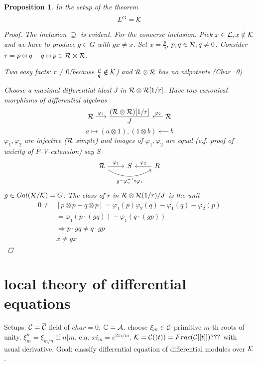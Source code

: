 \documentclass[11pt]{article}
\newtheorem{prop}[thm]{Proposition}
\newcommand{\cplx}{\mathbb C}
\newcommand{\cala}{{\cal A}}
\newcommand{\calc}{{\cal C}}
\newcommand{\calk}{{\cal K}}
\newcommand{\call}{{\cal L}}
\newcommand{\calr}{{\cal R}}
\newcommand{\Lrta}{\Longrightarrow}
\newcommand{\lrta}{\longrightarrow}
\begin{document}
\begin{prop}
In the setup of the theorem
$$
L^G=\calk
$$
\begin{proof}
The inclusion $\supseteq$ is evident. For the converse inclusion. Pick $x\in \call,x\notin\calk$ and we have to produce $g\in G$ with $gx\neq x$. Set $x=\frac{p}{q}$, $p,q\in\calr,q\neq 0$. Consider $r=p\otimes q-q\otimes p\in\calr\otimes\calr$. 

Two easy facts:
$r\neq 0$(because $\frac{p}{q}\notin\calk$) and $\calr\otimes \calr$ has no nilpotents (Char=0)

Choose a maximal differential ideal $J$ in $\calr\otimes\calr[1/r]$. Have tow canonical morphisms of differential algebras
$$
\calr\overset{\varphi_1}{\lrta} \frac{(\calr\otimes\calr)[1/r]}{J}\overset{\varphi_2}{\longleftarrow}\calr
$$
$$
a\longmapsto (a\otimes1),(1\otimes b)\longmapsfrom b
$$
$\varphi_1,\varphi_2$ are injective ($\calr$ simple) and images of $\varphi_1,\varphi_2$ are equal (c.f. proof of unicity of P-V-extension) say $S$
\[
\begin{tikzcd}
\calr\ar[r,"\varphi_1"]\ar[rr,swap,bend right,"g=\varphi^{-1}_2\circ \varphi_1"] & S & R\ar[l,swap,"\varphi_2"]
\end{tikzcd}
\]
$g\in Gal(\calr/\calk)=G$. The class of $r$ in $\calr\otimes\calr(1/r)/J$ is the unit 
$$
\begin{aligned}
0\neq &[p\otimes p-q\otimes p]=\varphi_1(p)\varphi_2(q)-\varphi_1(q)-\varphi_2(p)\\
&= \varphi_1(p\cdot(g q))-\varphi_1(q\cdot(g p))\\
&\Lrta p \cdot g q \neq q \cdot g p\\
& x\neq g x
\end{aligned}
$$
\end{proof}
\end{prop}

\section{local theory of differential equations}
Setups: $\calc=\overline{\calc}$ field of $char=0$. $\cplx=\cala$. choose $\xi_m\in\calc$-primitive $m$-th roots of unity. $\xi_m^n=\xi_{m/n}$ if $n|m.$ e.a. $xi_m=e^{2\pi i/m}$. $\calk=\calc((t))=Frac( \calc[[t]])???$ with usual derivative. Goal: classify differential equation of differential modules over $\calk$. 
\end{document}
